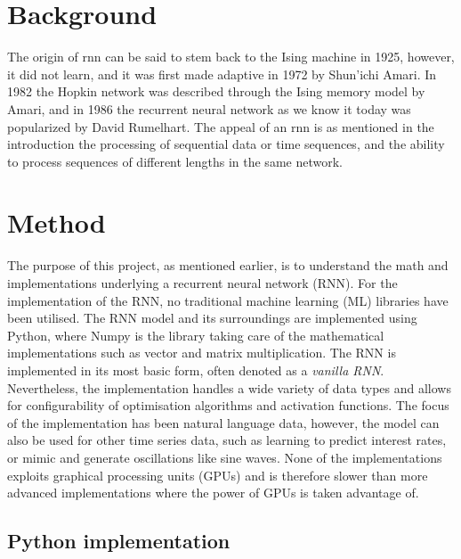\documentclass[12pt]{article}
\begin{document}
\section{Background}

The origin of \gls{rnn} can be said to stem back to the Ising machine in 1925, however, it did not learn, and it was first made adaptive in 1972 by Shun'ichi Amari. In 1982 the Hopkin network was described through the Ising memory model by Amari, and in 1986 the recurrent neural network as we know it today was popularized by David Rumelhart. The appeal of an \gls{rnn} is as mentioned in the introduction the processing of sequential data or time sequences, and the ability to process sequences of different lengths in the same network. 

\section{Method}
The purpose of this project, as mentioned earlier, is to understand the math and implementations underlying a recurrent neural network (RNN). For the implementation of the RNN, no traditional machine learning (ML) libraries have been utilised. The RNN model and its surroundings are implemented using Python, where Numpy \cite{NUMPY} is the library taking care of the mathematical implementations such as vector and matrix multiplication. The RNN is implemented in its most basic form, often denoted as a \textit{vanilla RNN}. Nevertheless, the implementation handles a wide variety of data types and allows for configurability of optimisation algorithms and activation functions. The focus of the implementation has been natural language data, however, the model can also be used for other time series data, such as learning to predict interest rates, or mimic and generate oscillations like sine waves. None of the implementations exploits graphical processing units (GPUs) and is therefore slower than more advanced implementations where the power of GPUs is taken advantage of.


\subsection{Python implementation}
\end{document}
